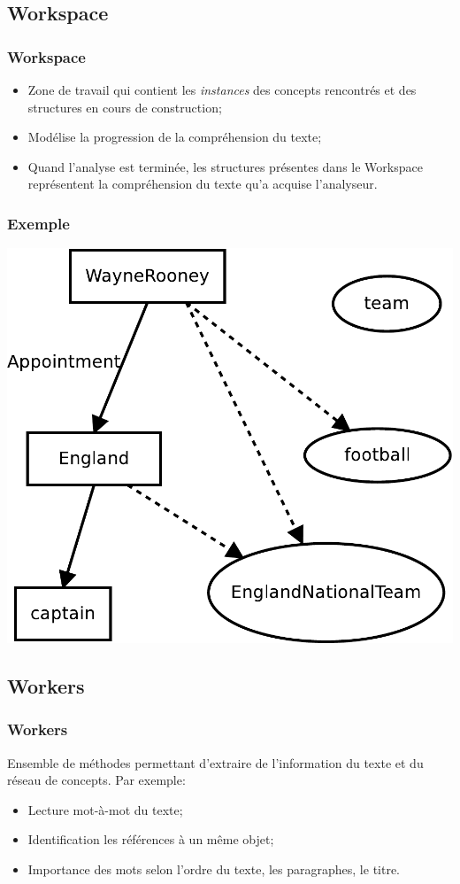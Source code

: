 \documentclass{beamer}
\begin{document}
    \subsection{Workspace}
        \begin{frame}
        \frametitle{Workspace}
            \begin{itemize}
                \item Zone de travail qui contient les \textit{instances} des concepts rencontrés et des structures en cours de construction;
                \item Modélise la progression de la compréhension du texte;
                \item Quand l'analyse est terminée, les structures présentes dans le Workspace représentent la compréhension du texte qu'a acquise l'analyseur.
            \end{itemize}
        \end{frame}

        \begin{frame}
        \frametitle{Exemple}
            \includegraphics[height=0.8\textheight]{RC/workspace_example.pdf}
        \end{frame}

    \subsection{Workers}
        \begin{frame}
        \frametitle{Workers}
            Ensemble de méthodes permettant d'extraire de l'information du texte et du réseau de concepts.\newline{}
            Par exemple:
            \begin{itemize}
                \item Lecture mot-à-mot du texte;
                \item Identification les références à un même objet;
                \item Importance des mots selon l'ordre du texte, les paragraphes, le titre.
            \end{itemize}
        \end{frame}
\end{document}
